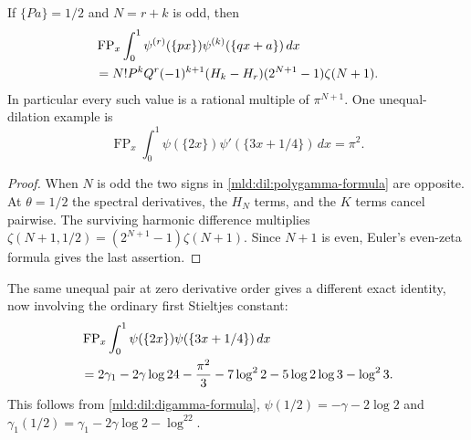 \begin{corollary}
If $\{Pa\}=1/2$ and $N=r+k$ is odd, then
\begin{align}
 &\operatorname{FP}_x\int_0^1
       \psi^{(r)}(\{px\})\psi^{(k)}(\{qx+a\})\,dx\notag\\
 &=N!P^kQ^r(-1)^{k+1}(H_k-H_r)
                       (2^{N+1}-1)\zeta(N+1).
 \label{mld:dil:half-odd}
\end{align}
In particular every such value is a rational multiple of
$\pi^{N+1}$.  One unequal-dilation example is
\begin{equation}
 \operatorname{FP}_x\int_0^1
       \psi(\{2x\})\psi'(\{3x+1/4\})\,dx=\pi^2.
 \label{mld:dil:pi2-example}
\end{equation}
\end{corollary}
\begin{proof}
When $N$ is odd the two signs in \eqref{mld:dil:polygamma-formula} are
opposite.  At $\theta=1/2$ the spectral derivatives, the $H_N$ terms,
and the $K$ terms cancel pairwise.  The surviving harmonic difference
multiplies $\zeta(N+1,1/2)=(2^{N+1}-1)\zeta(N+1)$.
Since $N+1$ is even, Euler's even-zeta formula gives the last assertion.
\end{proof}

The same unequal pair at zero derivative order gives a different exact
identity, now involving the ordinary first Stieltjes constant:
\begin{align}
 &\operatorname{FP}_x\int_0^1
       \psi(\{2x\})\psi(\{3x+1/4\})\,dx\notag\\
 &=2\gamma_1-2\gamma\log24-\frac{\pi^2}{3}
       -7\log^22-5\log2\log3-\log^23.
 \label{mld:dil:half-digamma-example}
\end{align}
This follows from \eqref{mld:dil:digamma-formula},
$\psi(1/2)=-\gamma-2\log2$ and
$\gamma_1(1/2)=\gamma_1-2\gamma\log2-\log^22$.

